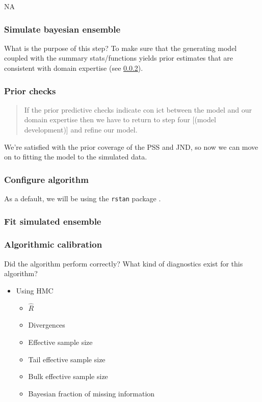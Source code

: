 \documentclass[11pt, oneside, openany]{scrbook}
\providecommand{\tightlist}{%
  \setlength{\itemsep}{0pt}\setlength{\parskip}{0pt}}
\begin{document}
NA

\hypertarget{simulate-bayesian-ensemble}{%
\subsubsection{Simulate bayesian ensemble}\label{simulate-bayesian-ensemble}}

What is the purpose of this step? To make sure that the generating model coupled with the summary stats/functions yields prior estimates that are consistent with domain expertise (see \ref{prior-checks}).

\hypertarget{prior-checks}{%
\subsubsection{Prior checks}\label{prior-checks}}

\begin{quote}
If the prior predictive checks indicate con ict between the model and our domain expertise then we have to return to step four {[}(model development){]} and refine our model.
\end{quote}

We're satisfied with the prior coverage of the PSS and JND, so now we can move on to fitting the model to the simulated data.

\hypertarget{configure-algorithm}{%
\subsubsection{Configure algorithm}\label{configure-algorithm}}

As a default, we will be using the \texttt{rstan} package \citep{R-rstan}.

\hypertarget{fit-simulated-ensemble}{%
\subsubsection{Fit simulated ensemble}\label{fit-simulated-ensemble}}

\hypertarget{algorithmic-calibration}{%
\subsubsection{Algorithmic calibration}\label{algorithmic-calibration}}

Did the algorithm perform correctly? What kind of diagnostics exist for this algorithm?

\begin{itemize}
\tightlist
\item
  Using HMC

  \begin{itemize}
  \tightlist
  \item
    \(\hat{R}\)
  \item
    Divergences
  \item
    Effective sample size
  \item
    Tail effective sample size
  \item
    Bulk effective sample size
  \item
    Bayesian fraction of missing information
  \end{itemize}
\end{itemize}
\end{document}
